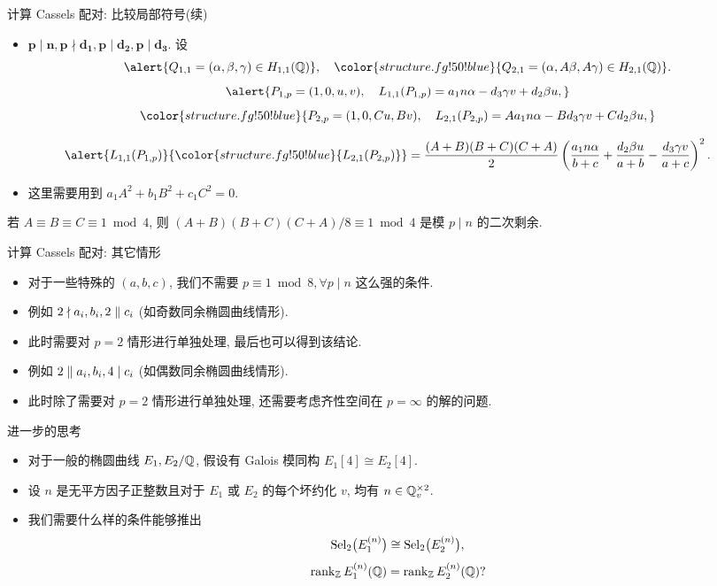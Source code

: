 \documentclass[handout,aspectratio=1610]{ctexbeamer}
\renewcommand\emph[1]{{\color{structure.fg!50!blue}{#1}}}
\begin{document}
\begin{frame}{计算 Cassels 配对: 比较局部符号(续)}
\begin{itemize}
\item $\bm{p\mid n,p\nmid d_1,p\mid d_2,p\mid d_3}$.
\onslide<+-> 
设
\[\alert{Q_{1,1}=(\alpha,\beta,\gamma)\in H_{1,1}(\BQ)},\quad
\emph{Q_{2,1}=(\alpha,A\beta,A\gamma)\in H_{2,1}(\BQ)}.\]
\[\alert{P_{1,p}=(1,0,u,v),\quad
L_{1,1}(P_{1,p})=a_1n\alpha-d_3\gamma v+d_2\beta u,}\]
\[\emph{P_{2,p}=(1,0,Cu,Bv),\quad
L_{2,1}(P_{2,p})=Aa_1n\alpha-Bd_3\gamma v+Cd_2\beta u,}\]
\end{itemize}
\onslide<+-> 
\[\alert{L_{1,1}(P_{1,p})}\emph{L_{2,1}(P_{2,p})}=\frac{(A+B)(B+C)(C+A)}2\left(\frac{a_1n\alpha}{b+c}+\frac{d_2\beta u}{a+b}-\frac{d_3\gamma v}{a+c}\right)^2.\]
\begin{itemize}
\item 这里需要用到 $a_1A^2+b_1B^2+c_1C^2=0$.
\end{itemize}
\begin{lemma}
若 $A\equiv B\equiv C\equiv 1\bmod 4$, 则 $(A+B)(B+C)(C+A)/8\equiv 1\bmod 4$ 是模 $p\mid n$ 的二次剩余.
\end{lemma}
\end{frame}


\begin{frame}{计算 Cassels 配对: 其它情形}
\begin{itemize}
\item 对于一些特殊的 $(a,b,c)$, 我们不需要 $p\equiv 1\bmod 8,\forall p\mid n$ 这么强的条件.
\item 例如 $2\nmid a_i,b_i,2\parallel c_i$ (如奇数同余椭圆曲线情形).
\item 此时需要对 $p=2$ 情形进行单独处理, 最后也可以得到该结论.
\item 例如 $2\parallel a_i,b_i, 4\mid c_i$ (如偶数同余椭圆曲线情形).
\item 此时除了需要对 $p=2$ 情形进行单独处理, 还需要考虑齐性空间在 $p=\infty$ 的解的问题.
\end{itemize}
\end{frame}

\begin{frame}{进一步的思考}
\begin{itemize}
\item 对于一般的椭圆曲线 $E_1,E_2/{\mathbb{Q}}$, 假设有 Galois 模同构 $E_1[4]\cong E_2[4]$.
\item 设 $n$ 是无平方因子正整数且对于 $E_1$ 或 $E_2$ 的每个坏约化 $v$, 均有 $n\in{\mathbb{Q}}_v^{\times2}$.
\item 我们需要什么样的条件能够推出
\[{\mathrm{Sel}}_2\bigl(E_1^{(n)}\bigr)\cong{\mathrm{Sel}}_2\bigl(E_2^{(n)}\bigr),\]
\[\operatorname{rank}_{\mathbb{Z}} E_1^{(n)}({\mathbb{Q}})=\operatorname{rank}_{\mathbb{Z}} E_2^{(n)}({\mathbb{Q}})?\]
\end{itemize}
\end{frame}
\end{document}
